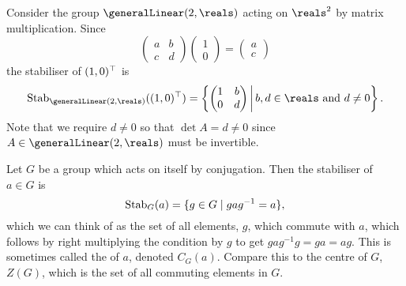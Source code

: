 \begin{exm}{}{}
    Consider the group \(\generalLinear(2, \reals)\) acting on \(\reals^2\) by matrix multiplication.
    Since
    \begin{equation}
        \begin{pmatrix}
            a & b\\
            c & d
        \end{pmatrix}
        \begin{pmatrix}
            1\\ 0
        \end{pmatrix}
        =
        \begin{pmatrix}
            a\\ c
        \end{pmatrix}
    \end{equation}
    the stabiliser of \((1, 0)^\top\) is
    \begin{equation}
        \Stab_{\generalLinear(2, \reals)}((1, 0)^{\trans}) = \left\{ 
        \begin{pmatrix}
            1 & b\\
            0 & d
        \end{pmatrix}
        \,\middle|\, b, d \in \reals \text{ and } d \ne 0
        \right\}.
    \end{equation}
    Note that we require \(d \ne 0\) so that \(\det A = d \ne 0\) since \(A \in \generalLinear(2, \reals)\) must be invertible.
\end{exm}

\begin{exm}{}{}
    Let \(G\) be a group which acts on itself by conjugation.
    Then the stabiliser of \(a \in G\) is
    \begin{equation}
        \operatorname{Stab}_G(a) = \{g \in G \mid gag^{-1} = a \},
    \end{equation}
    which we can think of as the set of all elements, \(g\), which commute with \(a\), which follows by right multiplying the condition by \(g\) to get \(gag^{-1}g = ga = ag\).
    This is sometimes called the  of \(a\), denoted \(C_G(a)\).
    Compare this to the centre of \(G\), \(Z(G)\), which is the set of all commuting elements in \(G\).
\end{exm}

